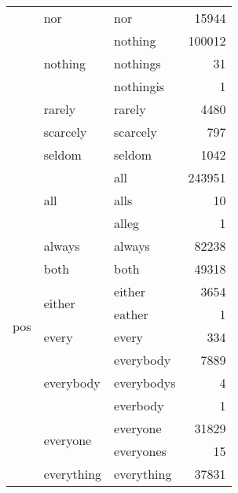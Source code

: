 \begin{longtable}[ht]{lllr}
\cline{2-4}
 & nor & nor & {\cellcolor[HTML]{F8FCC9}} \color[HTML]{000000} 15944 \\
\cline{2-4}
 & \multirow[c]{3}{*}{nothing} & nothing & {\cellcolor[HTML]{9ED9B8}} \color[HTML]{000000} 100012 \\
 &  & nothings & {\cellcolor[HTML]{FFFFD9}} \color[HTML]{000000} 31 \\
 &  & nothingis & {\cellcolor[HTML]{FFFFD9}} \color[HTML]{000000} 1 \\
\cline{2-4}
 & rarely & rarely & {\cellcolor[HTML]{FDFED5}} \color[HTML]{000000} 4480 \\
\cline{2-4}
 & scarcely & scarcely & {\cellcolor[HTML]{FFFFD9}} \color[HTML]{000000} 797 \\
\cline{2-4}
 & seldom & seldom & {\cellcolor[HTML]{FFFFD9}} \color[HTML]{000000} 1042 \\
\cline{1-4} \cline{2-4}
\multirow[c]{35}{*}{pos} & \multirow[c]{3}{*}{all} & all & {\cellcolor[HTML]{2351A2}} \color[HTML]{F1F1F1} 243951 \\
 &  & alls & {\cellcolor[HTML]{FFFFD9}} \color[HTML]{000000} 10 \\
 &  & alleg & {\cellcolor[HTML]{FFFFD9}} \color[HTML]{000000} 1 \\
\cline{2-4}
 & always & always & {\cellcolor[HTML]{BDE5B5}} \color[HTML]{000000} 82238 \\
\cline{2-4}
 & both & both & {\cellcolor[HTML]{E3F4B2}} \color[HTML]{000000} 49318 \\
\cline{2-4}
 & \multirow[c]{2}{*}{either} & either & {\cellcolor[HTML]{FDFED5}} \color[HTML]{000000} 3654 \\
 &  & eather & {\cellcolor[HTML]{FFFFD9}} \color[HTML]{000000} 1 \\
\cline{2-4}
 & every & every & {\cellcolor[HTML]{FFFFD9}} \color[HTML]{000000} 334 \\
\cline{2-4}
 & \multirow[c]{3}{*}{everybody} & everybody & {\cellcolor[HTML]{FCFED1}} \color[HTML]{000000} 7889 \\
 &  & everybodys & {\cellcolor[HTML]{FFFFD9}} \color[HTML]{000000} 4 \\
 &  & everbody & {\cellcolor[HTML]{FFFFD9}} \color[HTML]{000000} 1 \\
\cline{2-4}
 & \multirow[c]{2}{*}{everyone} & everyone & {\cellcolor[HTML]{F0F9B8}} \color[HTML]{000000} 31829 \\
 &  & everyones & {\cellcolor[HTML]{FFFFD9}} \color[HTML]{000000} 15 \\
\cline{2-4}
 & \multirow[c]{3}{*}{everything} & everything & {\cellcolor[HTML]{EDF8B2}} \color[HTML]{000000} 37831 \\

\end{longtable}
